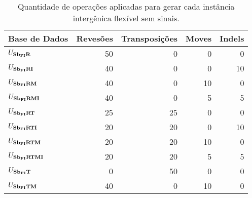 \begin{table}[!htb]
  \caption{Quantidade de operações aplicadas para gerar cada instância intergênica flexível sem sinais.}
  \label{table:YUYKVZOZ}
  \centering
  \begin{tabular}{|p{3cm}|r|r|r|r|}
    \hline
    Base de Dados           & Revesões   & Transposições   & Moves   & Indels    \\ \hline
    $U_{\textbf{Sb\textsubscript{FI}R}}{}$            & 50         & 0               &  0      &  0       \\ \hline
    $U_{\textbf{Sb\textsubscript{FI}RI}}{}$           & 40         & 0               &  0      & 10       \\ \hline
    $U_{\textbf{Sb\textsubscript{FI}RM}}{}$           & 40         & 0               & 10      &  0       \\ \hline
    $U_{\textbf{Sb\textsubscript{FI}RMI}}{}$          & 40         & 0               &  5      &  5       \\ \hline
    $U_{\textbf{Sb\textsubscript{FI}RT}}{}$           & 25         & 25              &  0      &  0       \\ \hline
    $U_{\textbf{Sb\textsubscript{FI}RTI}}{}$          & 20         & 20              &  0      & 10       \\ \hline
    $U_{\textbf{Sb\textsubscript{FI}RTM}}{}$          & 20         & 20              & 10      &  0       \\ \hline
    $U_{\textbf{Sb\textsubscript{FI}RTMI}}{}$         & 20         & 20              &  5      &  5       \\ \hline
    $U_{\textbf{Sb\textsubscript{FI}T}}{}$            & 0          & 50              &  0      &  0       \\ \hline
    $U_{\textbf{Sb\textsubscript{FI}TM}}{}$           & 40         & 0               & 10      &  0       \\ \hline
  \end{tabular}
\end{table}